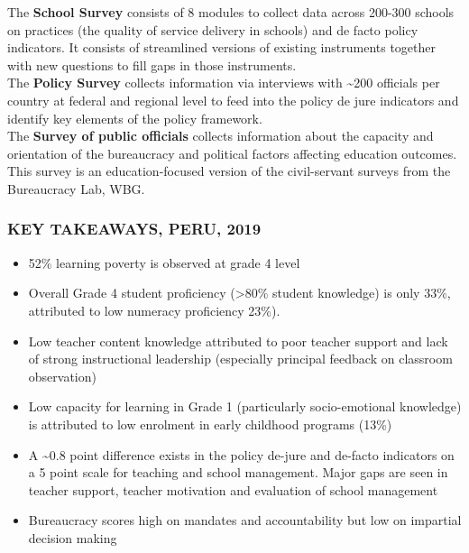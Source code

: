\documentclass[twocolumn]{article}
\begin{document}
The \textbf{School Survey} consists of 8 modules to collect data across
200-300 schools on practices (the quality of service delivery in
schools) and de facto policy indicators. It consists of streamlined
versions of existing instruments together with new questions to fill
gaps in those instruments.\\
The \textbf{Policy Survey} collects information via interviews with
\textasciitilde{}200 officials per country at federal and regional level
to feed into the policy de jure indicators and identify key elements of
the policy framework.\\
The \textbf{Survey of public officials} collects information about the
capacity and orientation of the bureaucracy and political factors
affecting education outcomes. This survey is an education-focused
version of the civil-servant surveys from the Bureaucracy Lab, WBG.

\hypertarget{key-takeaways-peru-2019}{%
\subsubsection{\texorpdfstring{\textbf{KEY TAKEAWAYS, PERU,
2019}}{KEY TAKEAWAYS, PERU, 2019}}\label{key-takeaways-peru-2019}}

\begin{itemize}
\item
  52\% learning poverty is observed at grade 4 level
\item
  Overall Grade 4 student proficiency (\textgreater{}80\% student
  knowledge) is only 33\%, attributed to low numeracy proficiency 23\%).
  \vfill\null
\item
  Low teacher content knowledge attributed to poor teacher support and
  lack of strong instructional leadership (especially principal feedback
  on classroom observation)
\item
  Low capacity for learning in Grade 1 (particularly socio-emotional
  knowledge) is attributed to low enrolment in early childhood programs
  (13\%)
\item
  A \textasciitilde{}0.8 point difference exists in the policy de-jure
  and de-facto indicators on a 5 point scale for teaching and school
  management. Major gaps are seen in teacher support, teacher motivation
  and evaluation of school management
\item
  Bureaucracy scores high on mandates and accountability but low on
  impartial decision making
\end{itemize}
\end{document}
